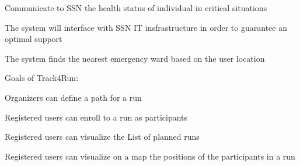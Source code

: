 \begin{goalList}
\begin{enumerate}[label={[}G 2.\arabic*{]}]
\item \label{goal:sos1}Communicate to SSN the health status of individual in critical situations
\item \label{goal:sos2}
The system will interface with SSN IT insfrastructure in order to guarantee an optimal support
\item \label{goal:sos3}The system finds the nearest emergency ward based on the user location

\end{enumerate}

Goals of Track4Run:
\begin{enumerate}[label={[}G 3.\arabic*{]}]

\item \label{goal:run1}
Organizers can define a path for a run
\item \label{goal:run2}Registered users can enroll to a run as participants
\item \label{goal:run3}Registered users can visualize the List of planned runs
\item \label{goal:run4}Registered users can visualize on a map the positions of the participants
in a run


\end{enumerate}

\end{goalList}

